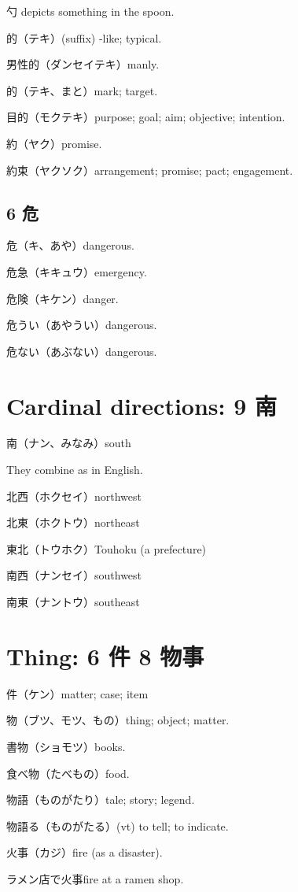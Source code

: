 勺 depicts something in the spoon.

的（テキ）(suffix) -like; typical.

男性的（ダンセイテキ）manly.

的（テキ、まと）mark; target.

目的（モクテキ）purpose; goal; aim; objective; intention.

約（ヤク）promise.

約束（ヤクソク）arrangement; promise; pact; engagement.

\subsection{6 危}

危（キ、あや）dangerous.

危急（キキュウ）emergency.

危険（キケン）danger.

危うい（あやうい）dangerous.

危ない（あぶない）dangerous.

\section{Cardinal directions: 9 南}

南（ナン、みなみ）south

They combine as in English.

北西（ホクセイ）northwest

北東（ホクトウ）northeast

東北（トウホク）Touhoku (a prefecture)

南西（ナンセイ）southwest

南東（ナントウ）southeast

\section{Thing: 6 件 8 物事}

件（ケン）matter; case; item

物（ブツ、モツ、もの）thing; object; matter.

書物（ショモツ）books.

食べ物（たべもの）food.

物語（ものがたり）tale; story; legend.

物語る（ものがたる）(vt) to tell; to indicate.

火事（カジ）fire (as a disaster).

ラメン店で火事fire at a ramen shop.

